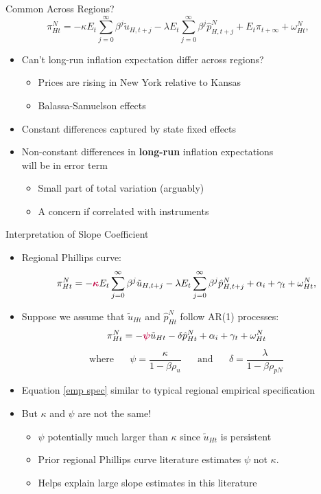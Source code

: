 \documentclass[10pt]{beamer}
\begin{document}
\begin{frame}{Common Across Regions?}
	\[\pi_{Ht}^N = - \kappa E_{t} \sum_{j=0}^{\infty} \beta^j  \tilde{u}_{H,t+j} - \lambda E_{t} \sum_{j=0}^{\infty} \beta^j \hat{p}_{H,t+j}^N + E_{t}\pi_{t+\infty} + \omega_{Ht}^N, \]
	\vspace{-10pt}
	\begin{itemize}
		\itemsep1em 
		\item Can't long-run inflation expectation differ across regions?
		\begin{itemize}
			\item Prices are rising in New York relative to Kansas
			\item Balassa-Samuelson effects 
		\end{itemize}
		\item Constant differences captured by state fixed effects
		\item Non-constant differences in \textbf{long-run} inflation expectations \\ will be in error term
		\begin{itemize}
			\item Small part of total variation (arguably)
			\item A concern if correlated with instruments
		\end{itemize}
	\end{itemize}
\end{frame}


\begin{frame}{Interpretation of Slope Coefficient}
	\begin{itemize}
		\itemsep1em 
		\item Regional Phillips curve:
		\[\pi_{Ht}^N = - \textcolor{purple}{\boldsymbol{\kappa}} E_{t} \sum_{j=0}^{\infty} \beta^j  \tilde{u}_{H,t+j} - \lambda E_{t} \sum_{j=0}^{\infty} \beta^j \hat{p}_{H,t+j}^N + \alpha_i + \gamma_t + \omega_{Ht}^N, \]
		\item Suppose we assume that $\tilde{u}_{Ht}$ and $\hat{p}_{Ht}^N$ follow AR(1) processes:
		\begin{equation} \label{emp spec} 
			\pi_{Ht}^N = - \textcolor{purple}{\boldsymbol{\psi}} \tilde{u}_{Ht} - \delta \hat{p}_{Ht}^N + \alpha_i + \gamma_t + \omega_{Ht}^N
		\end{equation} 
		\[ \text{where} \;\;\;\;\;\; \psi = \frac{\kappa}{1-\beta\rho_{u}} \;\;\;\;\;\; \text{and} \;\;\;\;\;\; \delta = \frac{\lambda}{1-\beta\rho_{pN}} \]
		\item Equation \eqref{emp spec} similar to typical regional empirical specification
		\item But $\kappa$ and $\psi$ are not the same! 
		\begin{itemize}
			\item $\psi$ potentially much larger than $\kappa$ since $\tilde{u}_{Ht}$ is persistent
			\item Prior regional Phillips curve literature estimates $\psi$ not $\kappa$.
			\item Helps explain large slope estimates in this literature  
		\end{itemize}
	\end{itemize}
\end{frame}
\end{document}
